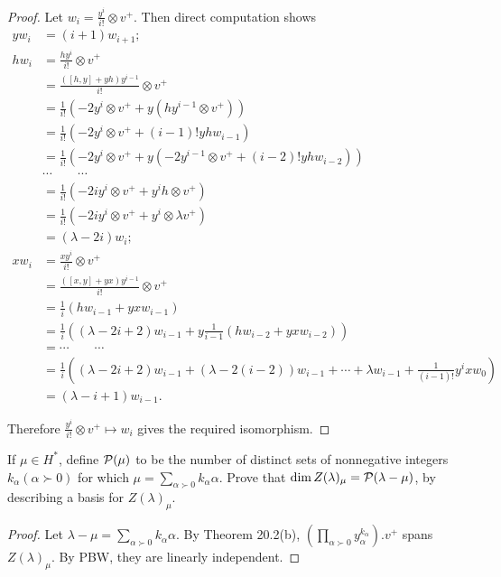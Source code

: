 \begin{proof}
	Let $w_i = \frac{y^i}{i!}\otimes v^+$. Then direct computation shows
	\begin{align*}
		yw_i & = (i+1)w_{i+1}; \\
		hw_i & = \frac{hy^i}{i!}\otimes v^+ \\
		         & = \frac{([h,y]+yh)y^{i-1}}{i!}\otimes v^+ \\
		         & = \frac{1}{i!}(-2y^i\otimes v^+ + y(hy^{i-1}\otimes v^+)) \\
		         & = \frac{1}{i!}(-2y^i\otimes v^+ + (i-1)!yhw_{i-1}) \\
		         & = \frac{1}{i!}(-2y^i\otimes v^+ + y(-2y^{i-1}\otimes v^+ + (i-2)!yhw_{i-2})) \\
		         & \cdots\qquad\cdots \\
		         & = \frac{1}{i!}(-2iy^i\otimes v^+ + y^ih\otimes v^+)  \\
		         & = \frac{1}{i!}(-2iy^i\otimes v^+ + y^i\otimes \lambda v^+) \\
		         & = (\lambda-2i)w_i; \\
		xw_i & = \frac{xy^i}{i!}\otimes v^+ \\
		         & = \frac{([x,y]+yx)y^{i-1}}{i!}\otimes v^+ \\
		         & = \frac{1}{i}(hw_{i-1} + yxw_{i-1}) \\
		         & = \frac{1}{i}((\lambda-2i+2)w_{i-1}+y\frac{1}{i-1}(hw_{i-2} + yxw_{i-2})) \\
		         & = \cdots\qquad\cdots \\
		         & = \frac{1}{i}((\lambda-2i+2)w_{i-1}+(\lambda-2(i-2))w_{i-1}+\cdots+\lambda w_{i-1}+ \frac{1}{(i-1)!}y^ixw_{0}) \\
		         & = (\lambda-i+1)w_{i-1}.
	\end{align*}
	
	Therefore $\frac{y^i}{i!}\otimes v^+\mapsto w_i$ gives the required isomorphism.
\end{proof}

\begin{ex}
	If $\mu\in H^{\ast}$, define ${\cal P}(\mu)$ to be the number of distinct sets of nonnegative integers $k_{\alpha} (\alpha\succ0)$ for which $\mu =\sum_{\alpha\succ0} k_{\alpha}\alpha$. Prove that $\dim Z(\lambda)_\mu = {\cal P}(\lambda-\mu)$, by describing a basis for $Z(\lambda)_\mu$.
\end{ex}
\begin{proof}
	Let $\lambda-\mu = \sum_{\alpha\succ0} k_{\alpha}\alpha$. By Theorem 20.2(b), $(\prod_{\alpha\succ0} y_{\alpha}^{k_{\alpha}}).v^+$ spans $Z(\lambda)_{\mu}$. By PBW, they are linearly independent.
\end{proof}

